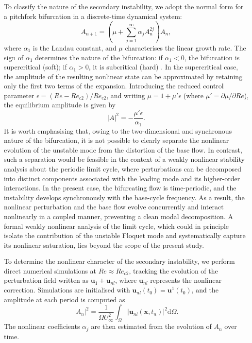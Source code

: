 To classify the nature of the secondary instability, we adopt the normal form for a pitchfork bifurcation in a discrete-time dynamical system:
%
\begin{equation}
A_{n+1} = \left( \mu + \sum_{j=1}^{\infty} \alpha_j A_n^{2j} \right) A_n,
\end{equation}
%
where $\alpha_1$ is the Landau constant, and $\mu$ characterises the linear growth rate. The sign of $\alpha_1$ determines the nature of the bifurcation: if $\alpha_1<0$, the bifurcation is supercritical (soft); if $\alpha_1>0$, it is subcritical (hard) \citep{kuznetsov-1997}. In the supercritical case, the amplitude of the resulting nonlinear state can be approximated by retaining only the first two terms of the expansion. Introducing the reduced control parameter $\epsilon = (Re-Re_{c2})/Re_{c2}$, and writing $\mu = 1 + \mu' \epsilon$ (where $\mu'  = \partial \mu/\partial Re$), the equilibrium amplitude is given by
%
\begin{equation}
|A|^2 = - \frac{\mu' \epsilon}{\alpha_1}.
\end{equation}
%
It is worth emphasising that, owing to the two-dimensional and synchronous nature of the bifurcation, it is not possible to clearly separate the nonlinear evolution of the unstable mode from the distortion of the base flow. In contrast, such a separation would be feasible in the context of a weakly nonlinear stability analysis about the periodic limit cycle, where perturbations can be decomposed into distinct components associated with the leading mode and its higher-order interactions. In the present case, the bifurcating flow is time-periodic, and the instability develops synchronously with the base-cycle frequency. As a result, the nonlinear perturbation and the base flow evolve concurrently and interact nonlinearly in a coupled manner, preventing a clean modal decomposition. A formal weakly nonlinear analysis of the limit cycle, which could in principle isolate the contribution of the unstable Floquet mode and systematically capture its nonlinear saturation, lies beyond the scope of the present study.

To determine the nonlinear character of the secondary instability, we perform direct numerical simulations at $Re\approx Re_{c2}$, tracking the evolution of the perturbation field written as $\bm{u}_1 + \bm{u}_{nl}$, where $\bm{u}_{nl}$ represents the nonlinear correction. Simulations are initialised with $\bm{u}_{nl}(t_0) = \bm{u}^1(t_0)$, and the amplitude at each period is computed as
%
\begin{equation}
|A_n|^2 = \frac{1}{\Omega U_\infty^2} \int_\Omega |\bm{u}_{nl}(\bm{x},t_n)|^2 \mathrm{d} \Omega.
\end{equation}
%
The nonlinear coefficients $\alpha_j$ are then estimated from the evolution of $A_n$ over time.

